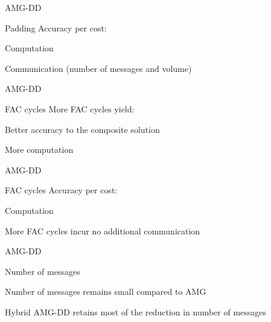 \documentclass[18pt,xcolor=table]{beamer}
\begin{document}
\begin{frame}{AMG-DD}
\begin{block}{Padding}
Accuracy per cost:
\bit
   \item Computation
   \item Communication (number of messages and volume)
\eit
\end{block}
\centering
\vspace{0.5 cm}
\end{frame}

\begin{frame}{AMG-DD}
\begin{block}{FAC cycles}
More FAC cycles yield:
\bit
   \item Better accuracy to the composite solution
   \item More computation
\eit
\end{block}
\centering
\vspace{0.5 cm}
\end{frame}

\begin{frame}{AMG-DD}
\begin{block}{FAC cycles}
Accuracy per cost:
\bit
   \item Computation
   \item More FAC cycles incur no additional communication
\eit
\end{block}
\centering
\vspace{0.5 cm}
\end{frame}

\begin{frame}{AMG-DD}
\begin{block}{Number of messages}
\bit
\item Number of messages remains small compared to AMG 
\item Hybrid AMG-DD retains most of the reduction in number of messages
\eit
\end{block}
\centering
\vspace{0.5 cm}
\end{frame}
\end{document}
